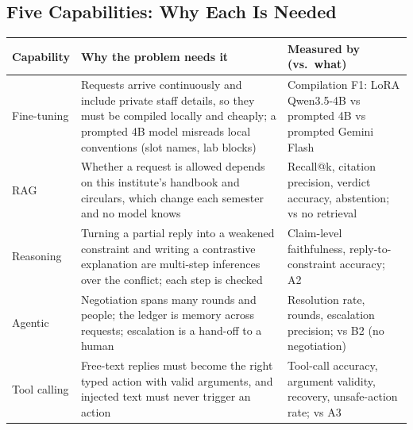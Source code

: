 \documentclass[11pt,a4paper]{article}
\begin{document}
\subsection{Five Capabilities: Why Each Is Needed}
\begin{table}[H]
\centering\small
\begin{tabularx}{\textwidth}{@{}L{1.75cm} Y L{5.1cm}@{}}
\toprule
\textbf{Capability} & \textbf{Why the problem needs it} & \textbf{Measured by (vs.\ what)}\\
\midrule
Fine-tuning & Requests arrive continuously and include private staff details, so they must be compiled locally and cheaply; a prompted 4B model misreads local conventions (slot names, lab blocks) & Compilation F1: LoRA Qwen3.5-4B vs prompted 4B vs prompted Gemini Flash\\
RAG & Whether a request is allowed depends on this institute's handbook and circulars, which change each semester and no model knows & Recall@k, citation precision, verdict accuracy, abstention; vs no retrieval\\
Reasoning & Turning a partial reply into a weakened constraint and writing a contrastive explanation are multi-step inferences over the conflict; each step is checked & Claim-level faithfulness, reply-to-constraint accuracy; A2\\
Agentic & Negotiation spans many rounds and people; the ledger is memory across requests; escalation is a hand-off to a human & Resolution rate, rounds, escalation precision; vs B2 (no negotiation)\\
Tool calling & Free-text replies must become the right typed action with valid arguments, and injected text must never trigger an action & Tool-call accuracy, argument validity, recovery, unsafe-action rate; vs A3\\
\bottomrule
\end{tabularx}
\end{table}
\end{document}
